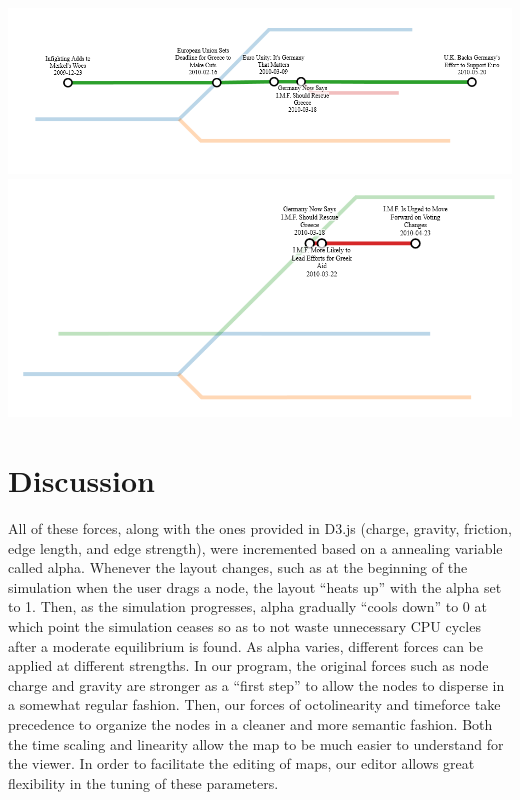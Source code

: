 \documentclass{chi2009}
\begin{document}
\includegraphics[width=\columnwidth]{Metro3.png}
\includegraphics[width=\columnwidth]{Metro4.png}

\section{Discussion}

All of these forces, along with the ones provided in D3.js (charge, gravity, friction, edge length, and edge strength), were incremented based on a annealing variable called alpha.  Whenever the layout changes, such as at the beginning of the simulation when the user drags a node, the layout “heats up” with the alpha set to 1.  Then, as the simulation progresses, alpha gradually “cools down” to 0 at which point the simulation ceases so as to not waste unnecessary CPU cycles after a moderate equilibrium is found.  As alpha varies, different forces can be applied at different strengths.  In our program, the original forces such as node charge and gravity are stronger as a “first step” to allow the nodes to disperse in a somewhat regular fashion.  Then, our forces of octolinearity and timeforce take precedence to organize the nodes in a cleaner and more semantic fashion.  Both the time scaling and linearity allow the map to be much easier to understand for the viewer.  In order to facilitate the editing of maps, our editor allows great flexibility in the tuning of these parameters.
\end{document}
